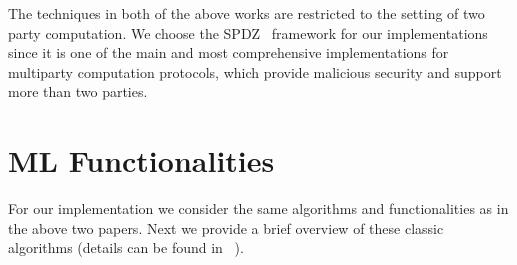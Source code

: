 \documentclass{article}
\begin{document}
The techniques in both of the above works are restricted to the setting of two party computation. We choose the SPDZ~\cite{SPDZ12,KSS13,KPR18} framework for our implementations since it is one of the main and most comprehensive 
implementations for multiparty computation protocols, which provide malicious security and support more than two parties.

\section{ML Functionalities}

For our implementation we consider the same algorithms and functionalities as in the above two papers. Next we provide a brief overview of these classic algorithms (details can be found in ~\cite{HTF09}).


\end{document}
